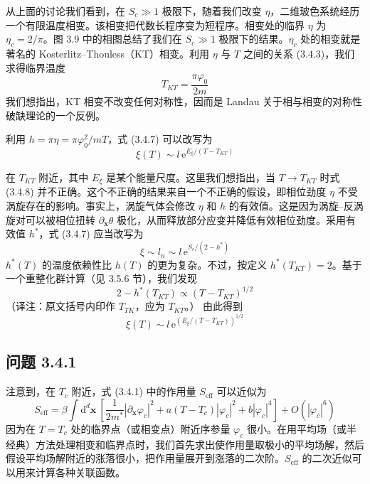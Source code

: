 从上面的讨论我们看到，在 $S_{c} \gg 1$ 极限下，随着我们改变 $\eta$，二维玻色系统经历一个有限温度相变。该相变把代数长程序变为短程序。相变处的临界 $\eta$ 为 $\eta_{c} = 2/\pi$。图 3.9 中的相图总结了我们在 $S_{c} \gg 1$ 极限下的结果。$\eta_{c}$ 处的相变就是著名的 Kosterlitz--Thouless（KT）相变。利用 $\eta$ 与 $T$ 之间的关系 (3.4.3)，我们求得临界温度
\begin{equation*}
T_{KT} = \frac{\pi\varphi_{0}}{2m}
\end{equation*}
我们想指出，KT 相变不改变任何对称性，因而是 Landau 关于相与相变的对称性破缺理论的一个反例。

利用 $h = \pi\eta = \pi\varphi_{0}^{2}/mT$，式 (3.4.7) 可以改写为
\begin{equation*}
\xi(T) \sim l\,\mathrm{e}^{E_{\xi}/(T-T_{KT})}
\tag{3.4.8}
\end{equation*}

\begin{smallnote}
在 $T_{KT}$ 附近，其中 $E_{\xi}$ 是某个能量尺度。这里我们想指出，当 $T \to T_{KT}$ 时式 (3.4.8) 并不正确。这个不正确的结果来自一个不正确的假设，即相位劲度 $\eta$ 不受涡旋存在的影响。事实上，涡旋气体会修改 $\eta$ 和 $h$ 的有效值。这是因为涡旋--反涡旋对可以被相位扭转 $\partial_{\pmb{x}}\theta$ 极化，从而释放部分应变并降低有效相位劲度。采用有效值 $h^{*}$，式 (3.4.7) 应当改写为
\begin{equation*}
\xi \sim l_{n} \sim l\,\mathrm{e}^{S_{c}/(2-h^{*})}
\tag{3.4.9}
\end{equation*}
$h^{*}(T)$ 的温度依赖性比 $h(T)$ 的更为复杂。不过，按定义 $h^{*}(T_{KT}) = 2$。基于一个重整化群计算（见 3.5.6 节），我们发现
\begin{equation*}
2 - h^{*}(T_{KT}) \propto (T - T_{KT})^{1/2}
\end{equation*}
（译注：原文括号内印作 $T_{TK}$，应为 $T_{KT}$。）
由此得到
\begin{equation*}
\xi(T) \sim l\,\mathrm{e}^{\left(E_{\xi}/(T-T_{KT})\right)^{1/2}}
\tag{3.4.10}
\end{equation*}
\end{smallnote}

\subsection*{问题 3.4.1}
注意到，在 $T_{c}$ 附近，式 (3.4.1) 中的作用量 $S_{\mathrm{eff}}$ 可以近似为
\begin{equation*}
S_{\mathrm{eff}} = \beta\int \mathrm{d}^{d}\pmb{x}\ \left[ \frac{1}{2m^{*}}|\partial_{\pmb{x}}\varphi_{c}|^{2} + a(T-T_{c})|\varphi_{c}|^{2} + b|\varphi_{c}|^{4} \right] + O(|\varphi_{c}|^{6})
\end{equation*}
因为在 $T = T_{c}$ 处的临界点（或相变点）附近序参量 $\varphi_{c}$ 很小。在用平均场（或半经典）方法处理相变和临界点时，我们首先求出使作用量取极小的平均场解，然后假设平均场解附近的涨落很小，把作用量展开到涨落的二次阶。$S_{\mathrm{eff}}$ 的二次近似可以用来计算各种关联函数。


